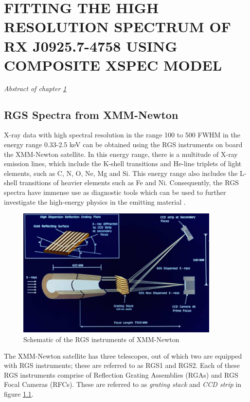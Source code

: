 \chapter{FITTING THE HIGH RESOLUTION SPECTRUM OF RX J0925.7-4758 USING COMPOSITE XSPEC MODEL} \label{chap:hi-resolution}
    \minitoc
    \begin{center}
    	\emph{Abstract of chapter \ref{chap:hi-resolution}}
    \end{center}

	\section{RGS Spectra from XMM-Newton} \label{hi-resolution:rgs-spec}
		X-ray data with high spectral resolution in the range 100 to 500 FWHM in the energy range 0.33-2.5 keV can be obtained using the RGS instruments on board the XMM-Newton satellite. In this energy range, there is a multitude of X-ray emission lines, which include the K-shell transitions and He-line triplets of light elements, such as C, N, O, Ne, Mg and Si. This energy range also includes the L-shell transitions of heavier elements such as Fe and Ni. Consequently, the RGS spectra have immense use as diagnostic tools which can be used to further investigate the high-energy physics in the emitting material \cite{xmmUserHandbook}.
		
		\begin{figure}[h!]
			\centering
			\caption{Schematic of the RGS instruments of XMM-Newton}
			\label{xmm-rgs-instrument}
			\includegraphics[width=0.9\textwidth]{xmm-rgs.png}
		\end{figure}
		
		The XMM-Newton satellite has three telescopes, out of which two are equipped with RGS instruments; these are referred to as RGS1 and RGS2. Each of these RGS instruments comprise of Reflection Grating Assemblies (RGAs) and RGS Focal Cameras (RFCs). These are referred to as \emph{grating stack} and \emph{CCD strip} in figure \ref{xmm-rgs-instrument}.
		
